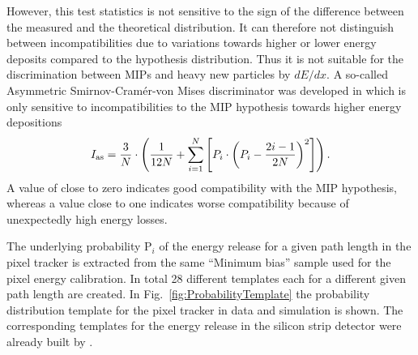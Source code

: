 However, this test statistics is not sensitive to the sign of the difference between the measured and the theoretical distribution.
It can therefore not distinguish between incompatibilities due to variations towards higher or lower energy deposits compared to the hypothesis distribution.
Thus it is not suitable for the discrimination between MIPs and heavy new particles by $dE/dx$.
A so-called Asymmetric Smirnov-Cram\'{e}r-von Mises discriminator was developed in \cite{bib:Quertenmont_2010} which is only sensitive to incompatibilities to the MIP hypothesis towards higher energy depositions
\begin{equation*}
I_{\text{as}} = \frac{3}{N} \cdot \left( \frac{1}{12N} + \sum\limits_{i=1}^N \left[ P_i \cdot \left(P_i - \frac{2i-1}{2N} \right)^2 \right] \right).
\end{equation*}
A value of \ias close to zero indicates good compatibility with the MIP hypothesis, whereas a value close to one indicates worse compatibility because of unexpectedly high energy losses.

The underlying probability P$_i$ of the energy release for a given path length in the pixel tracker is extracted from the same ``Minimum bias'' sample used for the pixel energy calibration.
In total 28 different templates each for a different given path length are created.
In Fig.~\ref{fig:ProbabilityTemplate} the probability distribution template for the pixel tracker in data and simulation is shown.
The corresponding templates for the energy release in the silicon strip detector were already built by  \cite{bib:Quertenmont_2010}.


